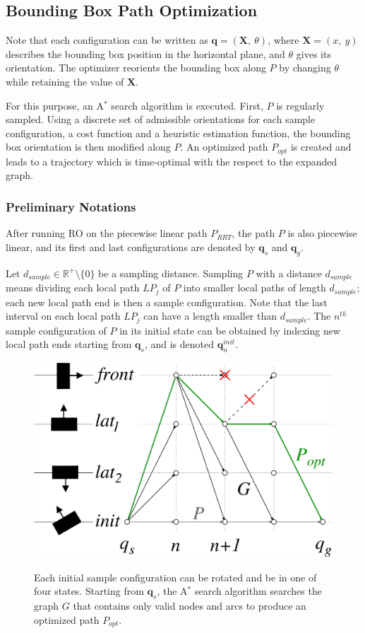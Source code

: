 \subsection{Bounding Box Path Optimization}
Note that each configuration \config{} can be written as $\mathbf{q} =
(\mathbf{X},~\theta)$, where $\mathbf{X} = (x,~y)$ describes the
bounding box position in the horizontal plane, and $\theta$ gives its
orientation.  The optimizer reorients the bounding box along $P$ by
changing $\theta$ while retaining the value of $\mathbf{X}$.

For this purpose, an A$^{*}$ search algorithm is executed. First, $P$
is regularly sampled. Using a discrete set of admissible orientations
for each sample configuration, a cost function and a heuristic
estimation function, the bounding box orientation is then modified
along $P$. An optimized path $P_{opt}$ is created and leads to a
trajectory which is time-optimal with the respect to the expanded
graph.

\subsubsection{Preliminary Notations}
After running RO on the piecewise linear path $P_{RRT}$, the
path $P$ is also piecewise linear, and its first and last
configurations are denoted by $\mathbf{q}_s$ and $\mathbf{q}_g$.

Let $d_{sample} \in \mathbb{R}^+\setminus\{0\}$ be a sampling
distance. Sampling $P$ with a distance $d_{sample}$ means dividing
each local path $LP_j$ of $P$ into smaller local paths of length
$d_{sample}$; each new local path end is then a sample
configuration. Note that the last interval on each local path $LP_j$
can have a length smaller than $d_{sample}$. The $n^{th}$ sample
configuration of $P$ in its initial state can be obtained by indexing
new local path ends starting from $\mathbf{q}_s$, and is denoted
$\mathbf{q}_n^{init}$.

\begin{figure}
  \centering
      {\includegraphics[width = 0.75\linewidth]
        {src/chap1-path-optimization/A-star.pdf}}
      \caption{Each initial sample configuration can be rotated and be
        in one of four states. Starting from $\mathbf{q}_s$, the
        A$^{*}$ search algorithm searches the graph $G$ that contains
        only valid nodes and arcs to produce an optimized path
        $P_{opt}$.}
      \label{fig:chap1-A-star}
\end{figure}

